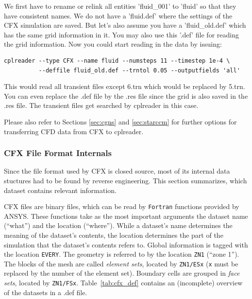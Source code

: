 \documentclass[a4paper,10pt]{article}
\begin{document}
We first have to rename or relink all entities 'fluid\_001' to 'fluid' so that
they have consistent  names.  We do not have a  'fluid.def' where the settings
of  the  CFX  simulation  are  saved.   But  let's  also  assume  you  have  a
'fluid\_old.def' which has the same grid  information in it.  You may also use
this  '.def' file  for  reading the  grid  information.  Now  you could  start
reading in the data by issuing:

\begin{verbatim}
cplreader --type CFX --name fluid --numsteps 11 --timestep 1e-4 \
          --deffile fluid_old.def --trntol 0.05 --outputfields 'all'
\end{verbatim}

This would  read all transient files  except 6.trn which would  be replaced by
5.trn.  You can even replace the .def  file by the .res file since the grid is
also saved in the .res file.  The transient files get searched by cplreader in
this case.

Please also refer to Sections \ref{sec:cgns} and \ref{sec:starccm} for further
options for transferring CFD data from CFX to cplreader.

\subsubsection{CFX File Format Internals}
Since the file format used by CFX is closed source, most of its internal data
stuctures had to be found by reverse engineering. This section summarizes,
which dataset contains relevant information.

CFX files are binary files, which can be read by \texttt{Fortran} functions
provided by ANSYS. These functions take as the most important arguments the
dataset name (``what'') and the location (``where''). While a dataset's name
determines the meaning of the dataset's contents, the location determines the
part of the simulation that the dataset's contents refers to. Global
information is tagged with the location \texttt{EVERY}. The geometry is
referred to by the location \texttt{ZN1} (``zone 1''). The blocks of the mesh
are called \emph{element sets}, located by \texttt{ZN1/ESx} (\texttt{x} must
be replaced by the number of the element set). Boundary cells are grouped in
\emph{face sets}, located by \texttt{ZN1/FSx}. Table~\ref{tab:cfx_def}
contains an (incomplete) overview of the datasets in a .def file.
\end{document}

